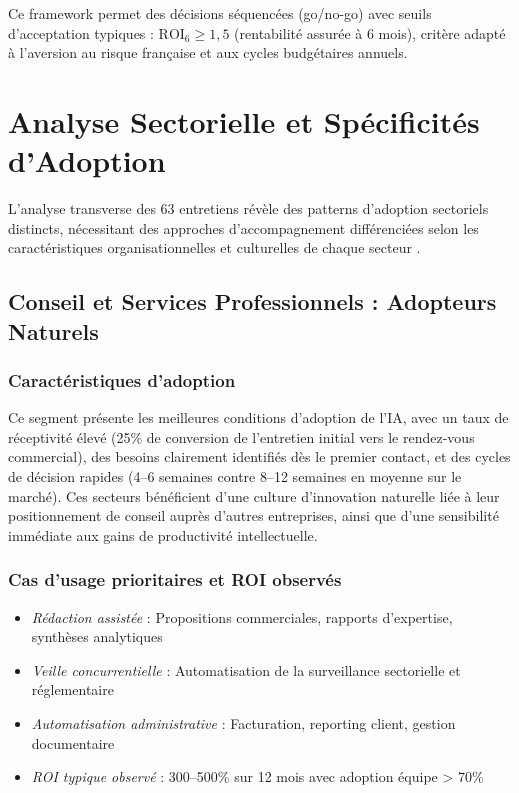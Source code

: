 Ce framework permet des décisions séquencées (go/no-go) avec seuils d'acceptation typiques : $\text{ROI}_6 \geq 1{,}5$ (rentabilité assurée à 6 mois), critère adapté à l'aversion au risque française et aux cycles budgétaires annuels.

\section{Analyse Sectorielle et Spécificités d'Adoption}

L'analyse transverse des 63 entretiens révèle des patterns d'adoption sectoriels distincts, nécessitant des approches d'accompagnement différenciées selon les caractéristiques organisationnelles et culturelles de chaque secteur \cite{luwai2025meetings}.

\subsection{Conseil et Services Professionnels : Adopteurs Naturels}

\subsubsection{Caractéristiques d'adoption}
Ce segment présente les meilleures conditions d'adoption de l'IA, avec un taux de réceptivité élevé (25\% de conversion de l'entretien initial vers le rendez-vous commercial), des besoins clairement identifiés dès le premier contact, et des cycles de décision rapides (4--6 semaines contre 8--12 semaines en moyenne sur le marché). Ces secteurs bénéficient d'une culture d'innovation naturelle liée à leur positionnement de conseil auprès d'autres entreprises, ainsi que d'une sensibilité immédiate aux gains de productivité intellectuelle.

\subsubsection{Cas d'usage prioritaires et ROI observés}
\begin{itemize}
    \item \emph{Rédaction assistée} : Propositions commerciales, rapports d'expertise, synthèses analytiques
    \item \emph{Veille concurrentielle} : Automatisation de la surveillance sectorielle et réglementaire  
    \item \emph{Automatisation administrative} : Facturation, reporting client, gestion documentaire
    \item \emph{ROI typique observé} : 300--500\% sur 12 mois avec adoption équipe > 70\%
\end{itemize}

